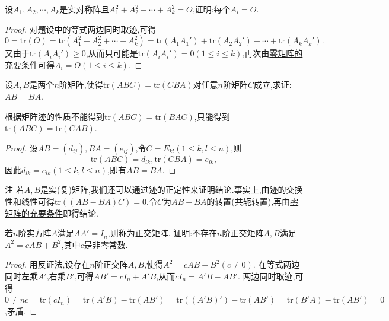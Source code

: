 \documentclass[../../main.tex]{subfiles}%
\begin{document}
\begin{example}
设\(A_1,A_2,\cdots,A_k\)是实对称阵且\(A_1^2 + A_2^2+\cdots+A_k^2 = O\),证明:每个\(A_i = O\).
\end{example}
\begin{proof}
对题设中的等式两边同时取迹,可得
\[
0=\mathrm{tr}(O)=\mathrm{tr}(A_1^2 + A_2^2+\cdots+A_k^2)=\mathrm{tr}(A_1A_1')+\mathrm{tr}(A_2A_2')+\cdots+\mathrm{tr}(A_kA_k').
\]
又由于\(\mathrm{tr}(A_iA_i')\geqslant 0\),从而只可能是\(\mathrm{tr}(A_iA_i') = 0(1\leqslant  i\leqslant  k)\),再次由\hyperref[proposition:零矩阵的充要条件]{零矩阵的充要条件}可得\(A_i = O(1\leqslant  i\leqslant  k)\).
\end{proof}

\begin{proposition}\label{proposition:矩阵可交换关于迹的充分条件}
设\(A,B\)是两个\(n\)阶矩阵,使得\(\mathrm{tr}(ABC)=\mathrm{tr}(CBA)\)对任意\(n\)阶矩阵\(C\)成立,求证:\(AB = BA\).
\end{proposition}
\begin{remark}
根据矩阵迹的性质不能得到$\mathrm{tr}(ABC)=\mathrm{tr}(BAC)$,只能得到$\mathrm{tr}(ABC)=\mathrm{tr}(CAB)$.
\end{remark}
\begin{proof}
设\(AB=(d_{ij}),BA=(e_{ij})\),令\(C = E_{kl}(1\leqslant  k,l\leqslant  n)\),则
\[
\mathrm{tr}(ABC)=d_{lk},\mathrm{tr}(CBA)=e_{lk},
\]
因此\(d_{lk}=e_{lk}(1\leqslant  k,l\leqslant  n)\),即有\(AB = BA\).
\end{proof}
\begin{remark}
注 若\(A,B\)是实(复)矩阵,我们还可以通过迹的正定性来证明结论.事实上,由迹的交换性和线性可得\(\mathrm{tr}((AB - BA)C)=0\),令\(C\)为\(AB - BA\)的转置(共轭转置),再由\hyperref[proposition:零矩阵的充要条件]{零矩阵的充要条件}即得结论.
\end{remark}

\begin{example}
若\(n\)阶实方阵\(A\)满足\(AA' = I_n\),则称为正交矩阵. 证明:不存在\(n\)阶正交矩阵\(A,B\)满足\(A^2 = cAB + B^2\),其中\(c\)是非零常数.
\end{example}
\begin{proof}
用反证法,设存在\(n\)阶正交阵\(A,B\),使得\(A^2 = cAB + B^2(c\neq0)\). 在等式两边同时左乘\(A'\),右乘\(B'\),可得\(AB' = cI_n + A'B\),从而\(cI_n = A'B - AB'\). 两边同时取迹,可得\(0\ne nc=\text{tr}(cI_n)=\text{tr}(A'B)-\text{tr}(AB')=\text{tr}((A'B)') - \text{tr}(AB')=\text{tr}(B'A)-\text{tr}(AB') = 0\),矛盾.
\end{proof}
\end{document}
